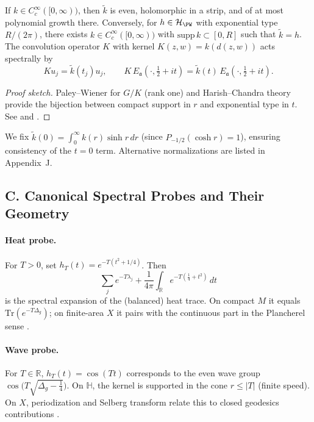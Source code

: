 \begin{theorem}
\label{thm:selberg-duality-sharp}
If $k\in C_c^\infty([0,\infty))$, then $\widetilde k$ is even, holomorphic in a strip, and of at most polynomial growth there. Conversely, for $h\in\mathcal H_{\PW}$ with exponential type $R/(2\pi)$, there exists $k\in C_c^\infty([0,\infty))$ with $\mathrm{supp}\,k\subset[0,R]$ such that $\widetilde k=h$. The convolution operator $K$ with kernel $K(z,w)=k(d(z,w))$ acts spectrally by
\[
  Ku_j=\widetilde k(t_j)u_j,\qquad
  K\,E_{\mathfrak a}(\cdot,\tfrac12+it)=\widetilde k(t)\,E_{\mathfrak a}(\cdot,\tfrac12+it).
\]
\end{theorem}

\begin{proof}[Proof sketch]
Paley–Wiener for $G/K$ (rank one) and Harish–Chandra theory provide the bijection between compact support in $r$ and exponential type in $t$. See \cite[Ch.~IV,V]{HelgasonGGA} and \cite[§2]{Hejhal1983}.
\end{proof}

\begin{remark}[Normalization at $t=0$]
We fix $\widetilde k(0)=\int_0^\infty k(r)\sinh r\,dr$ (since $P_{-1/2}( \cosh r)=1$), ensuring consistency of the $t=0$ term. Alternative normalizations are listed in Appendix~J.
\end{remark}


\subsection*{C. Canonical Spectral Probes and Their Geometry}
\label{subsec:canonical-probes-sharp}

\paragraph{Heat probe.}
For $T>0$, set $h_T(t)=e^{-T(t^2+1/4)}$. Then
\[
  \sum_j e^{-T\lambda_j}+\frac{1}{4\pi}\int_{\mathbb R} e^{-T(\tfrac14+t^2)}\,dt
\]
is the spectral expansion of the (balanced) heat trace. On compact $M$ it equals $\mathrm{Tr}(e^{-T\Delta_g})$; on finite-area $X$ it pairs with the continuous part in the Plancherel sense \cite{Minakshisundaram1949,Seeley1967}.

\paragraph{Wave probe.}
For $T\in\mathbb R$, $h_T(t)=\cos(Tt)$ corresponds to the even wave group $\cos\!\big(T\sqrt{\Delta_g-\tfrac14}\big)$. On $\mathbb H$, the kernel is supported in the cone $r\le |T|$ (finite speed). On $X$, periodization and Selberg transform relate this to closed geodesics contributions \cite{Selberg1956,Hejhal1983}.


